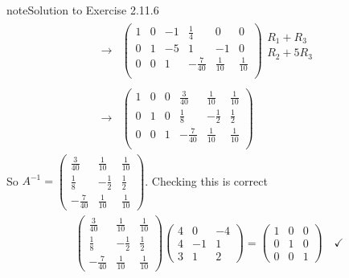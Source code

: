 \documentclass[letterpaper,10pt,english]{jupyterBook}
\begin{document}
\begin{sphinxadmonition}{note}{Solution to Exercise 2.11.6}
\begin{equation*}
\begin{split}
\begin{align*}
    \longrightarrow 
    & \left( \begin{array}{ccc|ccc} 
         1 & 0 & -1 & \frac{1}{4} & 0 & 0 \\ 
         0 & 1 & -5 & 1 & -1 & 0 \\ 
         0 & 0 & 1 & - \frac{7}{40} & \frac{1}{10} & \frac{1}{10} \\ 
    \end{array} \right) 
    \begin{array}{l} R_{1} + R_{3} \\ R_{2} + 5 R_{3}\\ \phantom{x} \end{array} \\ \\ 
    \longrightarrow 
    & \left( \begin{array}{ccc|ccc} 
         1 & 0 & 0 & \frac{3}{40} & \frac{1}{10} & \frac{1}{10} \\ 
         0 & 1 & 0 & \frac{1}{8} & - \frac{1}{2} & \frac{1}{2} \\ 
         0 & 0 & 1 & - \frac{7}{40} & \frac{1}{10} & \frac{1}{10} \\ 
    \end{array} \right) 
\end{align*} \end{split}
\end{equation*}
\sphinxAtStartPar
So \(A^{-1} = \left(\begin{matrix}\frac{3}{40} & \frac{1}{10} & \frac{1}{10}\\\frac{1}{8} & - \frac{1}{2} & \frac{1}{2}\\- \frac{7}{40} & \frac{1}{10} & \frac{1}{10}\end{matrix}\right)\). Checking this is correct
\begin{equation*}
\begin{split} \begin{align*} 
    \left(\begin{matrix}\frac{3}{40} & \frac{1}{10} & \frac{1}{10}\\\frac{1}{8} & - \frac{1}{2} & \frac{1}{2}\\- \frac{7}{40} & \frac{1}{10} & \frac{1}{10}\end{matrix}\right)\left(\begin{matrix}4 & 0 & -4\\4 & -1 & 1\\3 & 1 & 2\end{matrix}\right) = \left(\begin{matrix}1 & 0 & 0\\0 & 1 & 0\\0 & 0 & 1\end{matrix}\right) \quad \checkmark\end{align*} \end{split}
\end{equation*}\end{sphinxadmonition}
 \label{_pages/A2_Linear_systems_exercises_solutions:_pages/A2_Linear_systems_exercises_solutions-solution-6}
\end{document}
